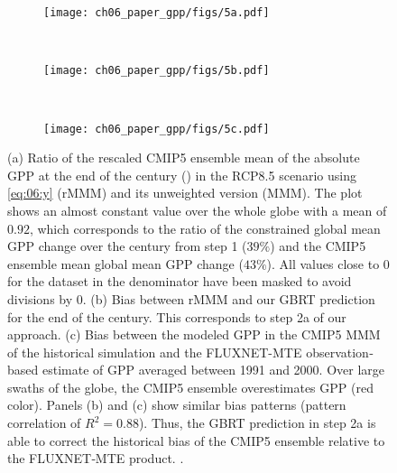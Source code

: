 \begin{figure}[!t]
  \centering
  \begin{subfigure}[b]{\SubfigureWidth{}}
    \texttt{[image: ch06\_paper\_gpp/figs/5a.pdf]}
    \caption{}
    \label{fig:06:step2a_results:a}
  \end{subfigure}
  \\
  \begin{subfigure}[b]{\SubfigureWidth{}}
    \texttt{[image: ch06\_paper\_gpp/figs/5b.pdf]}
    \caption{}
    \label{fig:06:step2a_results:b}
  \end{subfigure}
  ~
  \begin{subfigure}[b]{\SubfigureWidth{}}
    \texttt{[image: ch06\_paper\_gpp/figs/5c.pdf]}
    \caption{}
    \label{fig:06:step2a_results:c}
  \end{subfigure}
  \caption[
    Illustration of our \acl{ML} approach to constrain projected absolute
    \acf{GPP} at the end of the  century with observations in step 2a.
  ]{
    (a) Ratio of the rescaled \acs{CMIP}5 ensemble mean of the absolute
    \acf{GPP} at the end of the  century () in the
    \acs{RCP}8.5 scenario using \cref{eq:06:y} (r\acs{MMM}) and its unweighted
    version (\acs{MMM}). The plot shows an almost constant value over the whole
    globe with a mean of $0.92$, which corresponds to the ratio of the
    constrained global mean \acs{GPP} change over the  century from
    step 1 ($39 \unit{\%}$) and the \acs{CMIP}5 ensemble mean global mean
    \acs{GPP} change ($43 \unit{\%}$). All values close to $0$ for the dataset
    in the denominator have been masked to avoid divisions by $0$. (b) Bias
    between r\acs{MMM} and our \acf{GBRT} prediction for the end of the
     century. This corresponds to step 2a of our approach. (c) Bias
    between the modeled \acs{GPP} in the \acs{CMIP}5 \acs{MMM} of the
    historical simulation and the FLUXNET-MTE observation‐based estimate of
    \acs{GPP} \autocite{Jung2011} averaged between 1991 and 2000. Over large
    swaths of the globe, the \acs{CMIP}5 ensemble overestimates \acs{GPP} (red
    color). Panels (b) and (c) show similar bias patterns (pattern correlation
    of $R^2 = 0.88$). Thus, the \acs{GBRT} prediction in step 2a is able to
    correct the historical bias of the \acs{CMIP}5 ensemble relative to the
    FLUXNET‐MTE product. .
  }
  \label{fig:06:step2a_results}
\end{figure}

